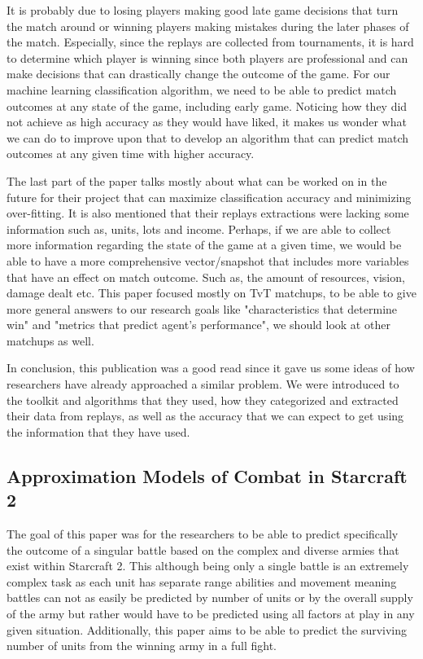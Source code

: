 \documentclass[a4paper,12pt]{report}
\begin{document}
It is probably due to losing players making good late game decisions that turn the match around or winning players making mistakes during the later phases of the match. Especially, since the replays are collected from tournaments, it is hard to determine which player is winning since both players are professional and can make decisions that can drastically change the outcome of the game. For our machine learning classification algorithm, we need to be able to predict match outcomes at any state of the game, including early game. Noticing how they did not achieve as high accuracy as they would have liked, it makes us wonder what we can do to improve upon that to develop an algorithm that can predict match outcomes at any given time with higher accuracy.

The last part of the paper talks mostly about what can be worked on in the future for their project that can maximize classification accuracy and minimizing over-fitting. It is also mentioned that their replays extractions were lacking some information such as, units, lots and income.
Perhaps, if we are able to collect more information regarding the state of the game at a given time, we would be able to have a more comprehensive vector/snapshot that includes more variables that have an effect on match outcome. Such as, the amount of resources, vision, damage dealt etc. This paper focused mostly on TvT matchups, to be able to give more general answers to our research goals like "characteristics that determine win" and "metrics that predict agent’s performance", we should look at other matchups as well.

In conclusion, this publication was a good read since it gave us some ideas of how researchers have already approached a similar problem. We were introduced to the toolkit and algorithms that they used, how they categorized and extracted their data from replays, as well as the accuracy that we can expect to get using the information that they have used.

\subsection{Approximation Models of Combat in Starcraft 2}

The goal of this paper was for the researchers to be able to predict specifically the outcome of a singular battle based on the complex and diverse armies that exist within Starcraft 2. This although being only a single battle is an extremely complex task as each unit has separate range abilities and movement meaning battles can not as easily be predicted by number of units or by the overall supply of the army but rather would have to be predicted using all factors at play in any given situation. Additionally, this paper aims to be able to predict the surviving number of units from the winning army in a full fight.
\end{document}
